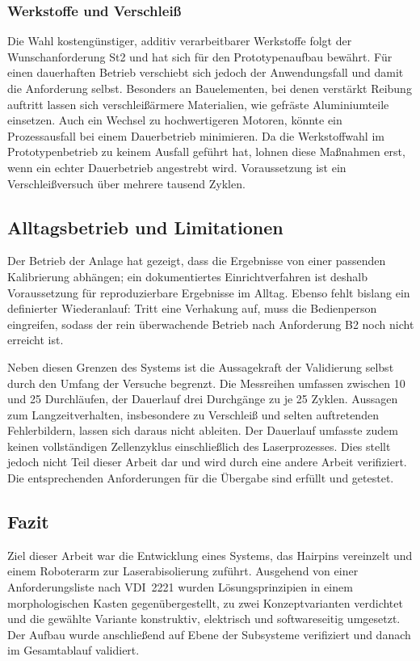 \subsubsection{Werkstoffe und Verschleiß}\label{sub:HF-Werkstoffe}
Die Wahl kostengünstiger, additiv verarbeitbarer Werkstoffe folgt der Wunschanforderung St2 und hat sich für den Prototypenaufbau 
bewährt. Für einen dauerhaften Betrieb verschiebt sich jedoch der Anwendungsfall und damit die Anforderung selbst.
Besonders an Bauelementen, bei denen verstärkt Reibung auftritt lassen sich verschleißärmere Materialien,
wie gefräste Aluminiumteile einsetzen. Auch ein Wechsel zu hochwertigeren Motoren, könnte ein Prozessausfall bei einem 
Dauerbetrieb minimieren. Da die Werkstoffwahl im Prototypenbetrieb zu keinem Ausfall geführt hat, lohnen diese Maßnahmen erst, 
wenn ein echter Dauerbetrieb angestrebt wird. Voraussetzung ist ein Verschleißversuch über mehrere tausend Zyklen.

\subsection{Alltagsbetrieb und Limitationen}\label{sub:Erkenntnisse}
Der Betrieb der Anlage hat gezeigt, dass die Ergebnisse von einer passenden Kalibrierung abhängen; ein
dokumentiertes Einrichtverfahren ist deshalb Voraussetzung für reproduzierbare Ergebnisse im Alltag. Ebenso
fehlt bislang ein definierter Wiederanlauf: Tritt eine Verhakung auf, muss die Bedienperson eingreifen, sodass
der rein überwachende Betrieb nach Anforderung B2 noch nicht erreicht ist.

Neben diesen Grenzen des Systems ist die Aussagekraft der Validierung selbst durch den Umfang der Versuche begrenzt.
Die Messreihen umfassen zwischen 10 und 25 Durchläufen, der Dauerlauf drei Durchgänge zu je 25 Zyklen. Aussagen zum 
Langzeitverhalten, insbesondere zu Verschleiß und selten auftretenden Fehlerbildern, lassen sich daraus nicht ableiten.
Der Dauerlauf umfasste zudem keinen vollständigen Zellenzyklus einschließlich des Laserprozesses. Dies stellt
jedoch nicht Teil dieser Arbeit dar und wird durch eine andere Arbeit verifiziert. Die entsprechenden Anforderungen
für die Übergabe sind erfüllt und getestet.

\subsection{Fazit}\label{sec:Fazit}
Ziel dieser Arbeit war die Entwicklung eines Systems, das Hairpins vereinzelt und einem Roboterarm zur
Laserabisolierung zuführt. Ausgehend von einer Anforderungsliste nach VDI~2221 wurden Lösungsprinzipien in
einem morphologischen Kasten gegenübergestellt, zu zwei Konzeptvarianten verdichtet und die gewählte Variante
konstruktiv, elektrisch und softwareseitig umgesetzt. Der Aufbau wurde anschließend auf Ebene der Subsysteme
verifiziert und danach im Gesamtablauf validiert.

